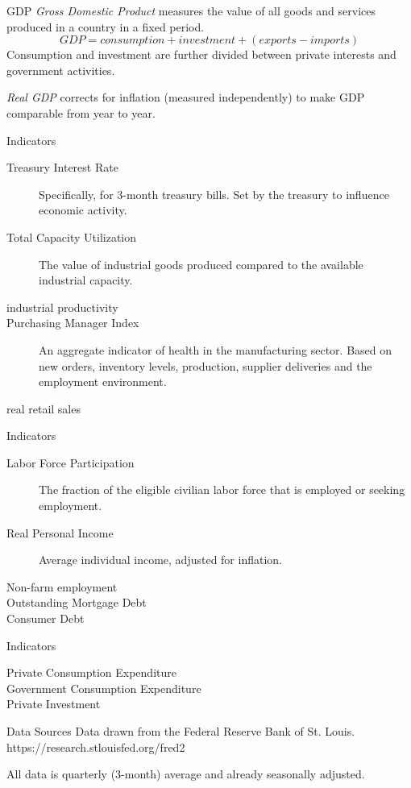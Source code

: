 \begin{frame}{GDP}
    \emph{Gross Domestic Product} measures the value of all goods and
    services produced in a country in a fixed period.    
    \[GDP = consumption + investment + (exports - imports)\]        
    Consumption and investment are further divided between private
    interests and government activities.
    
    \emph{Real GDP} corrects for inflation (measured independently) to make
    GDP comparable from year to year.        
\end{frame}

\begin{frame}{Indicators}
    \begin{description}
        \item [Treasury Interest Rate]
            Specifically, for 3-month treasury bills.  Set by the treasury to
            influence economic activity.
        \item [Total Capacity Utilization]
            The value of industrial goods produced compared to the available
            industrial capacity.
        \item [industrial productivity]
        \item [Purchasing Manager Index]
            An aggregate indicator of health in the manufacturing sector. 
            Based on new orders, inventory levels, production, supplier 
            deliveries and the employment environment.
        \item [real retail sales]
    \end{description}
\end{frame}

\begin{frame}{Indicators}
    \begin{description}
        \item [Labor Force Participation]
            The fraction of the eligible civilian labor force that is 
            employed or seeking employment.
        \item [Real Personal Income]
            Average individual income, adjusted for inflation.
        \item [Non-farm employment]
        \item [Outstanding Mortgage Debt]
        \item [Consumer Debt]
    \end{description}
\end{frame}

\begin{frame}{Indicators}
    \begin{description}
        \item [Private Consumption Expenditure]
        \item [Government Consumption Expenditure]
        \item [Private Investment]
    \end{description}
\end{frame}

\begin{frame}{Data Sources}
    Data drawn from the Federal Reserve Bank of St. Louis.
    https://research.stlouisfed.org/fred2
    
    All data is quarterly (3-month) average and already seasonally adjusted.
\end{frame}